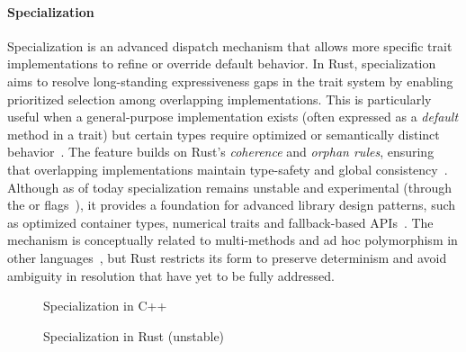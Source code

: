 \paragraph{Specialization}
Specialization is an advanced dispatch mechanism that allows more specific trait implementations to refine or override default behavior.
In Rust, specialization aims to resolve long-standing expressiveness gaps in the trait system by enabling prioritized selection among overlapping implementations.
This is particularly useful when a general-purpose implementation exists (often expressed as a \textit{default} method in a trait) but certain types require optimized or semantically distinct behavior~\cite{MatsakisRFC1210}.
The feature builds on Rust's \textit{coherence} and \textit{orphan rules}\cite{RustOrphanRules}, ensuring that overlapping implementations maintain type-safety and global consistency~\cite{Chlipala11}.
Although as of today specialization remains unstable and experimental (through the  or  flags~\cite{SpecializationRFC,MinSpecialization}), it provides a foundation for advanced library design patterns, such as optimized container types, numerical traits and fallback-based APIs~\cite{MatsakisRFC1210}.
The mechanism is conceptually related to multi-methods and ad hoc polymorphism in other languages~\cite{Chambers92,Castagna95}, but Rust restricts its form to preserve determinism and avoid ambiguity in resolution that have yet to be fully addressed.

\begin{figure}[htb!]
	\centering
	\captionsetup{type=listing,skip=2pt}
	\caption{Specialization in C++}
	\label{fig:cpp-specialization}
\end{figure}

\begin{figure}[htb!]
	\centering
	\captionsetup{type=listing,skip=2pt}
	\caption{Specialization in Rust (unstable)}
	\label{fig:rust-specialization}
\end{figure}


